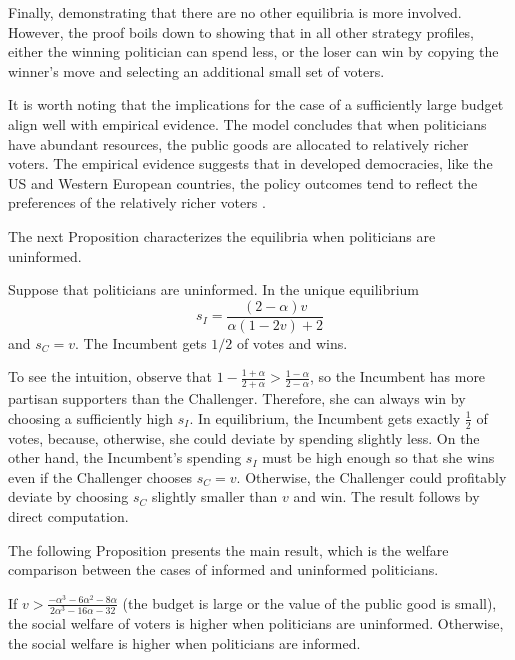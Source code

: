 \documentclass[12pt,english]{article}
\begin{document}
Finally, demonstrating that there are no other equilibria  is more involved. However, the proof boils down to showing that in all other strategy profiles, either the winning politician can spend less, or the loser can win by copying the winner's move and selecting an additional small set of voters. 

It is worth noting that the implications for the case of a sufficiently large budget align well with empirical evidence. The model concludes that when politicians have abundant resources, the public goods are allocated to relatively richer voters. The empirical evidence suggests that in developed democracies, like the US and Western European countries, the policy outcomes tend to reflect the preferences of the relatively richer voters \citep{gilens2005inequality,bartels2016unequal,schakel2021unequal}. 


The next Proposition characterizes the equilibria when politicians are uninformed. 

\begin{proposition}
\label{uninformed}
Suppose that politicians are uninformed. In the unique equilibrium
\begin{equation}
s_I = \frac{(2 - \alpha ) v}{\alpha  (1 - 2 v) + 2}
\end{equation}
and $s_C = v$. The Incumbent gets $1/2$ of votes and wins.
\end{proposition}
To see the intuition, observe that $1 - \frac{1+\alpha}{2 + \alpha}  >  \frac{1-\alpha}{2 - \alpha} $, so the Incumbent has more partisan supporters than the Challenger. Therefore, she can always win by choosing a sufficiently high $s_I$. In equilibrium, the Incumbent gets exactly $\frac{1}{2}$ of votes, because, otherwise, she could deviate by spending slightly less. On the other hand, the Incumbent's spending $s_I$ must be high enough so that she wins even if the Challenger chooses $s_C = v$. Otherwise, the Challenger could profitably deviate by choosing $s_C$ slightly smaller than $v$ and win. The result follows by direct computation. 

The following Proposition presents the main result, which is the welfare comparison between the cases of informed and uninformed politicians. 

\begin{proposition}
\label{welfare}
If $v>\frac{-\alpha ^3-6 \alpha ^2-8 \alpha }{2 \alpha ^3-16 \alpha -32}$ (the budget is large or the value of the public good is small), the social welfare of voters is higher when politicians are uninformed. Otherwise, the social welfare is higher when politicians are informed. 
\end{proposition}
\end{document}
